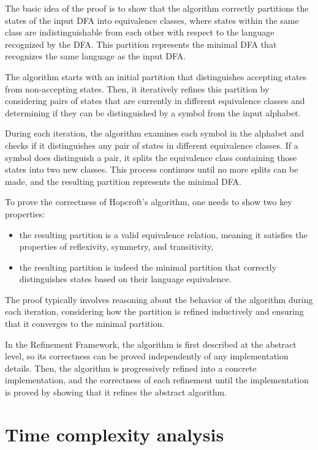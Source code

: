 \documentclass[12pt, a4 paper]{article}
\theoremstyle{definition}
\begin{document}
The basic idea of the proof is to show that the algorithm correctly partitions the states of the input DFA into equivalence classes, where states within the same class are indistinguishable from each other with respect to the language recognized by the DFA. This partition represents the minimal DFA that recognizes the same language as the input DFA.

The algorithm starts with an initial partition that distinguishes accepting states from non-accepting states. Then, it iteratively refines this partition by considering pairs of states that are currently in different equivalence classes and determining if they can be distinguished by a symbol from the input alphabet.

During each iteration, the algorithm examines each symbol in the alphabet and checks if it distinguishes any pair of states in different equivalence classes. If a symbol does distinguish a pair, it splits the equivalence class containing those states into two new classes. This process continues until no more splits can be made, and the resulting partition represents the minimal DFA.

To prove the correctness of Hopcroft's algorithm, one needs to show two key properties:
\begin{itemize}
    \item the resulting partition is a valid equivalence relation, meaning it satisfies the properties of reflexivity, symmetry, and transitivity,
    \item the resulting partition is indeed the minimal partition that correctly distinguishes states based on their language equivalence.
\end{itemize}

The proof typically involves reasoning about the behavior of the algorithm during each iteration, considering how the partition is refined inductively and ensuring that it converges to the minimal partition.

In the Refinement Framework, the algorithm is first described at the abstract level, so its correctness can be proved independently of any implementation details. Then, the algorithm is progressively refined into a concrete implementation, and the correctness of each refinement until the implementation is proved by showing that it refines the abstract algorithm.


\section{Time complexity analysis}
\end{document}
